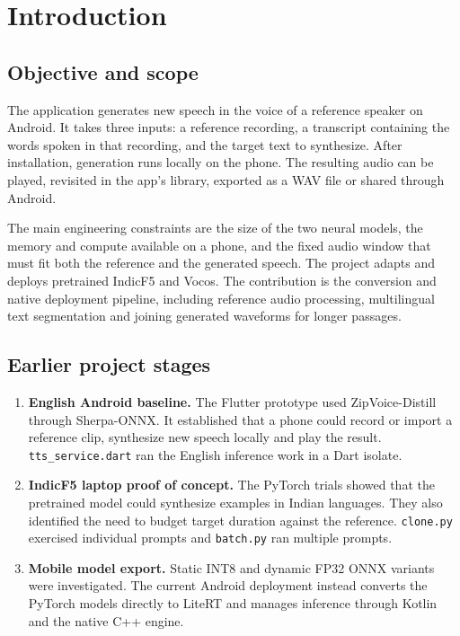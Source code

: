 \chapter{Introduction}
\enlargethispage{2\baselineskip}

\section{Objective and scope}

The application generates new speech in the voice of a reference speaker on
Android. It takes three inputs: a reference recording, a transcript containing
the words spoken in that recording, and the target text to synthesize. After
installation, generation runs locally on the phone. The resulting audio can be
played, revisited in the app's library, exported as a WAV file or shared through
Android.

The main engineering constraints are the size of the two neural models, the
memory and compute available on a phone, and the fixed audio window that must
fit both the reference and the generated speech. The project adapts and deploys
pretrained IndicF5 and Vocos. The contribution is the conversion and native
deployment pipeline, including reference audio processing, multilingual text
segmentation and joining generated waveforms for longer passages.

\section{Earlier project stages}

\begin{enumerate}[nosep]
  \item \textbf{English Android baseline.} The Flutter prototype used ZipVoice-Distill
        through Sherpa-ONNX. It established that a phone could record or import a
        reference clip, synthesize new speech locally and play the result.
        \texttt{tts\_service.dart} ran the English inference work in a Dart isolate.
  \item \textbf{IndicF5 laptop proof of concept.} The PyTorch trials showed that
        the pretrained model could synthesize examples in Indian languages.
        They also identified the need to budget target duration against the
        reference. \texttt{clone.py} exercised individual prompts and
        \texttt{batch.py} ran multiple prompts.
  \item \textbf{Mobile model export.} Static INT8 and dynamic FP32 ONNX
        variants were investigated. The current Android deployment instead
        converts the PyTorch models directly to LiteRT and manages inference
        through Kotlin and the native C++ engine.
\end{enumerate}
